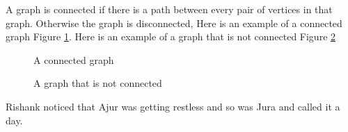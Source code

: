 \vspace{3in}
A graph is connected if there is a path between every pair of vertices in that graph. Otherwise the graph is disconnected,  Here is an example of a connected graph Figure \ref{3g9}. Here is an example of a graph that is not connected Figure \ref{3g10}
\begin{figure}
\begin{center}
\caption{ A connected graph}\label{3g9}
\end{center}
\end{figure}

\begin{figure}
\begin{center}
\caption{ A graph that is not connected}\label{3g10}
\end{center}
\end{figure}
\vspace{3in}
Rishank noticed that Ajur was getting restless and so was Jura and  called it a day.